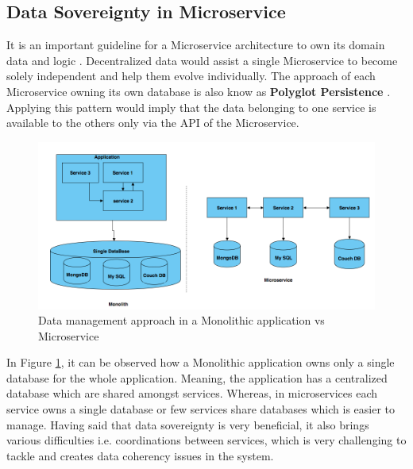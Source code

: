     \newpage
    \subsection{Data Sovereignty in Microservice}
    \label{subsection:dataSovereignty}
    It is an important guideline for a Microservice architecture to own its domain data and 
    logic \cite[p.~29]{Torre2017}. Decentralized data would assist a single Microservice
    to become solely independent and help them evolve individually. The approach of each Microservice owning its own database is also
    know as \textbf{Polyglot Persistence} \cite{Polyglot}. Applying this pattern would imply that the
    data belonging to one service is available to the others only via the API of the Microservice.

    \begin{figure}[H]
        \centering \includegraphics[scale=0.4]{grafiken/polyglot.png}
        \caption{Data management approach in a Monolithic application vs Microservice \cite{FowlerMartin}}
        \label{fig:polyglot}
    \end{figure}
    
   In Figure \ref{fig:polyglot}, it can be observed how a Monolithic application owns only a single database for the whole application. Meaning,
   the application has a centralized database which are shared amongst services. Whereas, in microservices each service owns
   a single database or few services share databases which is easier to manage. Having said that data sovereignty is very beneficial, it also brings various difficulties
   i.e. coordinations between services, which is very challenging to tackle and creates data coherency issues in the system. 




